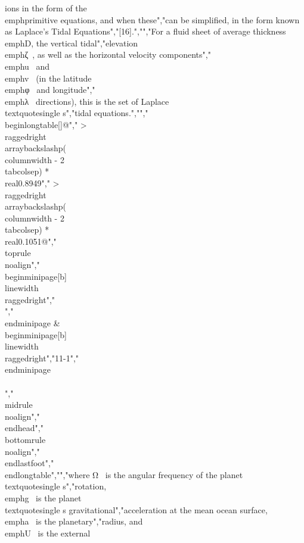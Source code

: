 {{{{{{{ions in the form of the \\emph{primitive equations}, and when these","can be simplified, in the form known as Laplace's Tidal Equations","{[}16{]}.","","For a fluid sheet of average thickness \\emph{D}, the vertical tidal","elevation \\emph{ζ}~, as well as the horizontal velocity components","\\emph{u}~ and \\emph{v}~ (in the latitude \\emph{φ}~ and longitude","\\emph{λ}~ directions), this is the set of Laplace\\textquotesingle s","tidal equations.","","\\begin{longtable}[]{@{}","  >{\\raggedright\\arraybackslash}p{(\\columnwidth - 2\\tabcolsep) * \\real{0.8949}}","  >{\\raggedright\\arraybackslash}p{(\\columnwidth - 2\\tabcolsep) * \\real{0.1051}}@{}}","\\toprule\\noalign{}","\\begin{minipage}[b]{\\linewidth}\\raggedright","\\[\\begin{array}{r}","\\frac{\\partial\\zeta}{\\partial t} + \\frac{1}{a\\cos(\\varphi)}\\lbrack\\frac{\\partial}{\\partial\\lambda}(uD) + \\frac{\\partial}{\\partial\\varphi}(vD\\cos(\\varphi))\\rbrack = 0, \\\\","\\frac{\\partial u}{\\partial t} - v(2\\Omega sin(\\varphi)) + \\frac{1}{a\\cos(\\varphi)}\\frac{\\partial}{\\partial\\lambda}(g\\zeta + U) = 0, \\\\","\\frac{\\partial v}{\\partial t} + u(2\\Omega sin(\\varphi)) + \\frac{1}{a}\\frac{\\partial}{\\partial\\varphi}(g\\zeta + U) = 0,","\\end{array}\\]","\\end{minipage} & \\begin{minipage}[b]{\\linewidth}\\raggedright","11-1","\\end{minipage} \\\\","\\midrule\\noalign{}","\\endhead","\\bottomrule\\noalign{}","\\endlastfoot","\\end{longtable}","","where Ω~ is the angular frequency of the planet\\textquotesingle s","rotation, \\emph{g}~ is the planet\\textquotesingle s gravitational","acceleration at the mean ocean surface, \\emph{a}~ is the planetary","radius, and \\emph{U}~ is the external}}}}}}}
